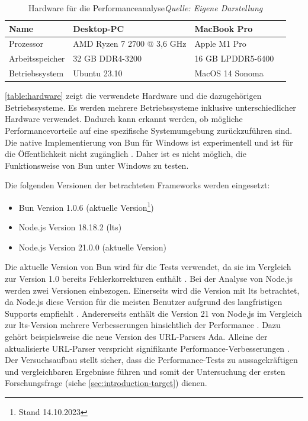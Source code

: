 \begin{table}[h]
	\caption[Hardware für die Performanceanalyse]{Hardware für die Performanceanalyse\protect\linebreak\textit{Quelle: Eigene Darstellung}}
	\label{table:hardware}
	\centering
	\begin{tabular}{|p{4.5cm}|p{4.5cm}|p{4.5cm}|p{4.5cm}|}
		\hline
		Name & Desktop-PC & MacBook Pro \\
		\hline
		Prozessor & AMD Ryzen 7 2700 @ 3,6 GHz & Apple M1 Pro \\
		\hline
		Arbeitsspeicher & 32 GB DDR4-3200 & 16 GB LPDDR5-6400 \\
		\hline
		Betriebssystem & Ubuntu 23.10 & MacOS 14 Sonoma \\
		\hline
	\end{tabular}
\end{table}

\noindent
\autoref{table:hardware} zeigt die verwendete Hardware und die dazugehörigen Betriebssysteme. Es werden mehrere Betriebssysteme inklusive unterschiedlicher Hardware verwendet. Dadurch kann erkannt werden, ob mögliche Performancevorteile auf eine spezifische Systemumgebung zurückzuführen sind. Die native Implementierung von Bun für Windows ist experimentell und ist für die Öffentlichkeit nicht zugänglich \cite{Verhelst.2023}. Daher ist es nicht möglich, die Funktionsweise von Bun unter Windows zu testen.

\noindent
Die folgenden Versionen der betrachteten Frameworks werden eingesetzt:
\begin{itemize}
	\item Bun Version 1.0.6 (aktuelle Version\footnote{Stand 14.10.2023\label{footnote:Stand}})
	\item Node.js Version 18.18.2 (\ac{lts})
	\item Node.js Version 21.0.0 (aktuelle Version)
\end{itemize}

\noindent
Die aktuelle Version von Bun wird für die Tests verwendet, da sie im Vergleich zur Version 1.0 bereits Fehlerkorrekturen enthält \cite{Sumner.2023b}. Bei der Analyse von Node.js werden zwei Versionen einbezogen. Einerseits wird die Version mit \ac{lts} betrachtet, da Node.js diese Version für die meisten Benutzer aufgrund des langfristigen Supports empfiehlt \cite{OpenJSFoundation.o.J.d}. Andererseits enthält die Version 21 von Node,js im Vergleich zur \ac{lts}-Version mehrere Verbesserungen hinsichtlich der Performance \cite{OpenJSFoundation.2023b}. Dazu gehört beispielsweise die neue Version des URL-Parsers Ada. Alleine der aktualisierte URL-Parser verspricht signifikante Performance-Verbesserungen \cite{OpenJSFoundation.2023}.\newline
Der Versuchsaufbau stellt sicher, dass die Performance-Tests zu aussagekräftigen und vergleichbaren Ergebnisse führen und somit der Untersuchung der ersten Forschungsfrage (siehe \autoref{sec:introduction-target}) dienen.

